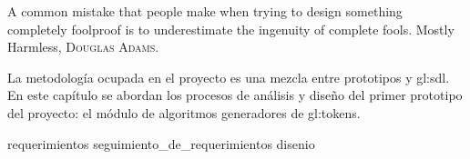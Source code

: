 %
%

{
  \epigrafe
  {%
    A common mistake that people make when trying to design something completely
    foolproof is to underestimate the ingenuity of complete fools.%
  }
  {%
    Mostly Harmless,
    \textsc{Douglas Adams}.%
  }
}

\noindent
La metodología ocupada en el proyecto es una mezcla entre prototipos y
\gls{gl:sdl}. En este capítulo se abordan los procesos de análisis y
diseño del primer prototipo del proyecto: el módulo de algoritmos
generadores de \glspl{gl:token}.

{requerimientos}
{seguimiento_de_requerimientos}
{disenio}
